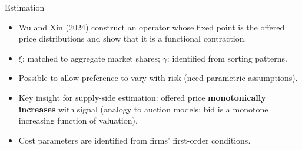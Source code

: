 \documentclass[10pt,aspectratio=169]{beamer}
\begin{document}
\begin{frame}{Estimation}
    \begin{itemize}
        \item Wu and Xin (2024) construct an operator whose fixed point is the offered price distributions and show that it is a functional contraction.
        
        \medskip
        \item $\xi$: matched to aggregate market shares; $\gamma$: identified from sorting patterns.
        
        \medskip
        \item Possible to allow preference to vary with risk (need parametric assumptions).
        
        \medskip
        \item Key insight for supply-side estimation: offered price \textbf{monotonically increases} with signal (analogy to auction models: bid is a monotone increasing function of valuation).
        
        \medskip
        \item Cost parameters are identified from firms' first-order conditions.
    \end{itemize}
\end{frame}
\end{document}
